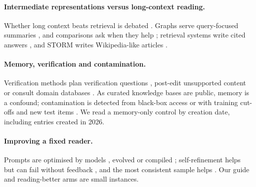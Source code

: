 \documentclass{article} %
\begin{document}
\paragraph{Intermediate representations versus long-context reading.}
Whether long context beats retrieval is debated \citep{Li2024LongContext,Yu2024DefenseRag,liu2024lost,Zhang2024ChainAgents,Li2025LaraBenchmarking}. Graphs serve query-focused summaries \citep{edge2024local}, and comparisons ask when they help \citep{han2025rag,xiang2025use}; retrieval systems write cited answers \citep{Lla2023PaperqaRetrievalaugmented,Asai2024OpenscholarSynthesizing,singh2025ai2}, and STORM writes Wikipedia-like articles \citep{shao2024assisting}.

\paragraph{Memory, verification and contamination.}
Verification methods plan verification questions \citep{dhuliawala2024chainofverification}, post-edit unsupported content \citep{Gao2022RarrResearching} or consult domain databases \citep{wang2025geneagent}. As curated knowledge bases are public, memory is a confound; contamination is detected from black-box access \citep{Shi2023DetectingPretraining,oren2024proving,golchin2024time,Golchin2025DataContamination} or with training cut-offs and new test items \citep{Roberts2023DataContamination,Jain2024LivecodebenchHolistic,White2024LivebenchChallenging}. We read a memory-only control by creation date, including entries created in 2026.

\paragraph{Improving a fixed reader.}
Prompts are optimised by models \citep{Zhou2022LargeLanguage,Pryzant2023AutomaticPrompt,Yang2023LargeLanguage}, evolved \citep{Guo2023EvopromptConnecting,Fernando2023PromptbreederSelfreferential,agrawal2026gepa} or compiled \citep{Khattab2023DspyCompiling,Opsahlong2024OptimizingInstructions}; self-refinement helps \citep{Madaan2023SelfrefineIterative} but can fail without feedback \citep{Huang2023LargeLanguage}, and the most consistent sample helps \citep{Wang2022SelfconsistencyImproves,Chen2023UniversalSelfconsistency}. Our guide and reading-better arms are small instances.
\end{document}
